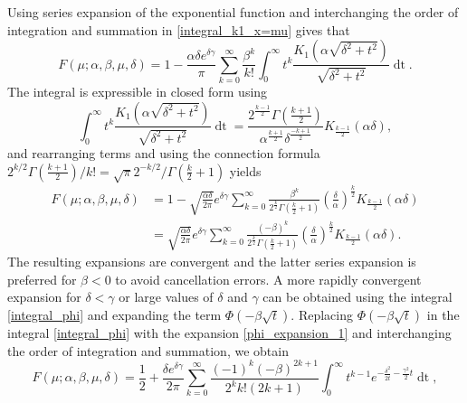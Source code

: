 \documentclass[10pt,a4paper,oneside]{article}
\numberwithin{equation}{section}
\begin{document}
Using series expansion of the exponential function and interchanging the order of integration and summation in \eqref{integral_k1_x=mu} gives that
\begin{equation*}
F(\mu; \alpha, \beta, \mu, \delta) = 1 - \frac{\alpha \delta e^{\delta \gamma}}{\pi} \sum_{k=0}^{\infty}\frac{\beta^k}{k!}\int_{0}^{\infty} t^k \frac{K_1\left(\alpha\sqrt{\delta^2 + t^2}\right)}{\sqrt{\delta^2 + t^2}} \mathop{dt}.
\end{equation*}
The integral is expressible in closed form using \cite[\S 6.596]{gradshteyn2007}
\begin{equation*}
\int_0^{\infty} t^k \frac{K_1\left(\alpha\sqrt{\delta^2 + t^2}\right)}{\sqrt{\delta^2 + t^2}} \mathop{dt} = \frac{2^{\frac{k-1}{2}} \Gamma\left(\frac{k+1}{2}\right)}{\alpha^{\frac{k+1}{2}} \delta^{\frac{-k+1}{2}}}K_{\frac{k-1}{2}}(\alpha\delta),
\end{equation*}
and rearranging terms and using the connection formula $2^{k/2}  \Gamma\left(\frac{k+1}{2}\right)/ k! = \sqrt{\pi} 2^{-k/2} / \Gamma\left(\frac{k}{2} + 1\right)$ yields
\begin{align}
F(\mu; \alpha, \beta, \mu, \delta) &= 1 - \sqrt{\frac{\alpha \delta}{2\pi}}e^{\delta \gamma} \sum_{k=0}^{\infty}\frac{\beta^k}{2^{\frac{k}{2}}\Gamma\left(\frac{k}{2} + 1\right)} \left(\frac{\delta}{\alpha}\right)^{\frac{k}{2}} K_{\frac{k-1}{2}}(\alpha \delta)\\
&=\sqrt{\frac{\alpha \delta}{2\pi}}e^{\delta \gamma} \sum_{k=0}^{\infty}\frac{(-\beta)^k}{2^{\frac{k}{2}}\Gamma\left(\frac{k}{2} + 1\right)} \left(\frac{\delta}{\alpha}\right)^{\frac{k}{2}} K_{\frac{k-1}{2}}(\alpha \delta).
\end{align}
The resulting expansions are convergent and the latter series expansion is preferred for $\beta < 0$ to avoid cancellation errors. A more rapidly convergent expansion for $\delta < \gamma$ or large values of $\delta$ and $\gamma$ can be obtained using the integral \eqref{integral_phi} and expanding the term $\Phi(-\beta\sqrt{t})$. Replacing $\Phi(-\beta\sqrt{t})$ in the integral \eqref{integral_phi} with the expansion \eqref{phi_expansion_1} and interchanging the order of integration and summation, we obtain
\begin{equation}\label{expansion_x=mu_pre}
F(\mu; \alpha, \beta, \mu, \delta) = \frac{1}{2} + \frac{\delta e^{\delta \gamma}}{2\pi}\sum_{k=0}^{\infty}\frac{(-1)^k (-\beta)^{2k+1}}{2^k k! (2k+1)} \int_0^{\infty} t^{k - 1} e^{-\frac{\delta^2}{2t} - \frac{\gamma^2}{2}t} \mathop{dt},
\end{equation}
\end{document}
